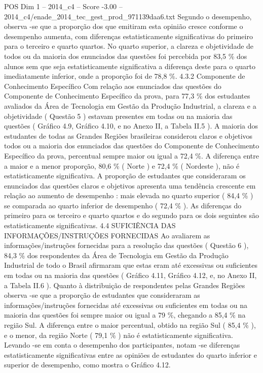 \begin{textsample}{POS Dim 1 – 2014\_c4 – Score -3.00 – 2014\_c4/enade\_2014\_tec\_gest\_prod\_971139daa6.txt}
Segundo o desempenho, observa -se que a proporção dos que emitiram esta opinião cresce conforme o desempenho aumenta, com diferenças estatisticamente significativas do primeiro para o terceiro e quarto quartos.
No quarto superior, a clareza e objetividade de todos ou da maioria dos enunciados das questões foi percebida por 83,5 \% dos alunos sem que seja estatisticamente significativa a diferença deste para o quarto imediatamente inferior, onde a proporção foi de 78,8 \%. 4.3.2 Componente de Conhecimento Específico Com relação aos enunciados das questões do Componente de Conhecimento Específico da prova, para 77,3 \% dos estudantes avaliados da Área de Tecnologia em Gestão da Produção Industrial, a clareza e a objetividade ( Questão 5 ) estavam presentes em todas ou na maioria das questões ( Gráfico 4.9, Gráfico 4.10, e no Anexo II, a Tabela II.5 ).
A maioria dos estudantes de todas as Grandes Regiões brasileiras considerou claros e objetivos todos ou a maioria dos enunciados das questões do Componente de Conhecimento Específico da prova, percentual sempre maior ou igual a 72,4 \%.
A diferença entre a maior e a menor proporção, 80,6 \% ( Norte ) e 72,4 \% ( Nordeste ), não é estatisticamente significativa.
A proporção de estudantes que consideraram os enunciados das questões claros e objetivos apresenta uma tendência crescente em relação ao aumento de desempenho : mais elevada no quarto superior ( 84,4 \% ) se comparada ao quarto inferior de desempenho ( 72,4 \% ).
As diferenças do primeiro para os terceiro e quarto quartos e do segundo para os dois seguintes são estatisticamente significativas. 4.4 SUFICIÊNCIA DAS INFORMAÇÕES/INSTRUÇÕES FORNECIDAS Ao avaliarem as informações/instruções fornecidas para a resolução das questões ( Questão 6 ), 84,3 \% dos respondentes da Área de Tecnologia em Gestão da Produção Industrial de todo o Brasil afirmaram que estas eram até excessivas ou suficientes em todas ou na maioria das questões ( Gráfico 4.11, Gráfico 4.12, e, no Anexo II, a Tabela II.6 ).
Quanto à distribuição de respondentes pelas Grandes Regiões observa -se que a proporção de estudantes que consideraram as informações/instruções fornecidas até excessivas ou suficientes em todas ou na maioria das questões foi sempre maior ou igual a 79 \%, chegando a 85,4 \% na região Sul.
A diferença entre o maior percentual, obtido na região Sul ( 85,4 \% ), e o menor, da região Norte ( 79,1 \% ) não é estatisticamente significativa.
Levando -se em conta o desempenho dos participantes, notam -se diferenças estatisticamente significativas entre as opiniões de estudantes do quarto inferior e superior de desempenho, como mostra o Gráfico 4.12.

\end{textsample}
